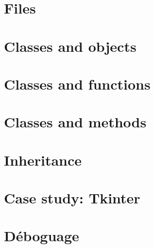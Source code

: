 \documentclass[french,10pt]{book}
\newcommand{\FR}{\color{blue} \normalsize}
\newcommand{\EN}{\color{red} \normalsize}
\newcommand{\UN}{\color{black}\normalsize}
\begin{document}
\chapter{Files}

\EN
\chapter{Classes and objects}

\EN
\chapter{Classes and functions}
\label{time}

\EN
\chapter{Classes and methods}

\EN
\chapter{Inheritance}

\EN
\chapter{Case study: Tkinter}

\UN
\appendix
\FR
\chapter{Déboguage}

\UN
\printindex

\clearemptydoublepage
\end{document}
